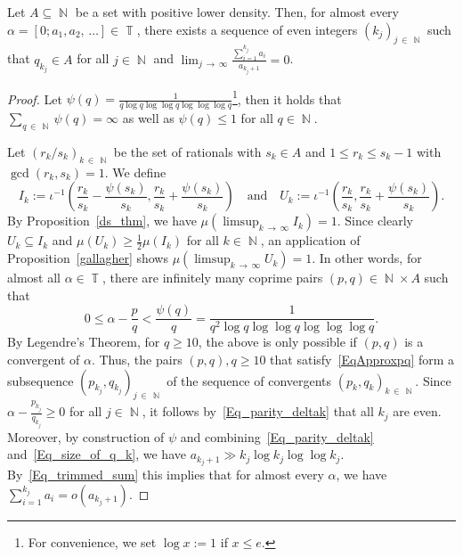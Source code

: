 \documentclass[AHL,Unicode,longabstracts,published]{cedram}
\DeclareMathOperator{\N}{\mathbb{N}}
\DeclareMathOperator{\T}{\mathbb{T}}
\begin{document}
\begin{lemm}\label{Lem_seq_kj}
Let $A \subseteq \N$ be a set with positive lower density. Then, for almost every $\alpha = [0;a_1, a_2,\,\ldots] \in \T$, there exists a sequence of even integers $(k_j)_{j\,\in\,\N}$ such that $q_{k_j} \in A$ for all $j \in \N$ and $ \lim_{j\,\to\,\infty} \frac{\sum_{i=1}^{k_j} a_i }{a_{k_j +1}} = 0$.
\end{lemm}


\begin{proof}
Let $ \psi(q) = \frac{1}{q \log q \log \log q \log \log \log q }$\footnote{For convenience, we set $ \log x := 1$ if $x \leq e$.}, then it holds that $ \sum_{q\,\in\,\N} \psi(q)= \infty$ as well as $\psi(q) \leq 1$ for all $q \in \N$.


Let $(r_k/s_k)_{k\,\in\,\N}$ be the set of rationals with $s_k \in A$ and $1 \leq r_k \leq s_{k}-1$ with $\gcd(r_k,s_k) =1$. We define
\begin{equation*}
I_k:= \iota^{-1}\left(\frac{r_k}{s_k} - \frac{\psi(s_k)}{s_k}, \frac{r_k}{s_k} + \frac{\psi(s_k)}{s_k} \right) \quad \text{and} \quad U_k := \iota^{-1}\left(\frac{r_k}{s_k}, \frac{r_k}{s_k} + \frac{\psi(s_k)}{s_k} \right).
\end{equation*}
By Proposition~\ref{ds_thm}, we have $\mu(\limsup_{k\,\to\,\infty} I_k) = 1$. Since clearly $U_k \subseteq I_k$ and $ \mu(U_k) \geq \frac{1}{2}\mu(I_k)$ for all $k \in \N$, an application of Proposition~\ref{gallagher} shows \newline$ \mu(\limsup_{k\,\rightarrow\,\infty} U_k)  = 1$. In other words, for almost all $\alpha \in \T$, there are infinitely many coprime pairs $(p,q) \in \N \times A$ such that
\begin{equation}\label{EqApproxpq}
0 \leq \alpha - \frac{p}{q} < \frac{\psi(q)}{q} = \frac{1}{q^2 \log q \log \log q \log \log \log q}.
\end{equation}
By Legendre's Theorem, for $q \geq 10$, the above is only possible if $ (p,q)$ is a convergent of $\alpha $. Thus, the pairs $(p,q), q \geq 10$ that satisfy~\eqref{EqApproxpq} form a subsequence $ (p_{k_j}, q_{k_j})_{j\,\in\,\N}$ of the sequence of convergents $ (p_k, q_k)_{k\,\in\,\N}$. Since $\alpha - \frac{p_{k_j}}{q_{k_j}} \geq 0 $ for all $j \in \N$, it follows by~\eqref{Eq_parity_deltak} that all $k_j$ are even. Moreover, by construction of $\psi$ and combining~\eqref{Eq_parity_deltak} and~\eqref{Eq_size_of_q_k}, we have $ a_{k_j+1} \gg k_j \log k_j \log \log k_j$. By~\eqref{Eq_trimmed_sum} this implies that for almost every $\alpha$, we have $\sum_{i=1}^{k_j} a_i = o (a_{k_j +1}) $.
\end{proof}
\end{document}
